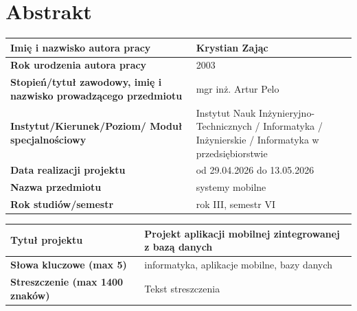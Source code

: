 
\renewcommand{\rmdefault}{ptm} %
\renewcommand{\sfdefault}{phv} %
\chapter*{\fontsize{12}{14}\selectfont Abstrakt}

\vspace{0.5cm}
\noindent
\begin{tabular}{|p{5cm}|p{10cm}|}
\hline
\textbf{Imię i nazwisko autora pracy} & Krystian Zając\\
\hline
\textbf{Rok urodzenia autora pracy} & 2003\\
\hline
\textbf{Stopień/tytuł zawodowy, imię i nazwisko prowadzącego przedmiotu} & mgr inż. Artur Pelo\\
\hline
\textbf{Instytut/Kierunek/Poziom/ Moduł specjalnościowy} & Instytut Nauk Inżynieryjno-Technicznych / Informatyka / Inżynierskie / Informatyka w przedsiębiorstwie\\
\hline
\textbf{Data realizacji projektu} & od 29.04.2026 do 13.05.2026\\
\hline
\textbf{Nazwa przedmiotu} & systemy mobilne\\
\hline
\textbf{Rok studiów/semestr} & rok III, semestr VI\\
\hline
\end{tabular}

\vspace{1.5cm}

\noindent
\begin{tabular}{|p{5cm}|p{10cm}|}
\hline
\textbf{Tytuł projektu} & Projekt aplikacji mobilnej zintegrowanej z bazą danych\\
\hline
\textbf{Słowa kluczowe (max 5)} & informatyka, aplikacje mobilne, bazy danych\\
\hline
\textbf{Streszczenie (max 1400 znaków)} & Tekst streszczenia \\
\hline
\end{tabular}

\vspace{1.5cm}
